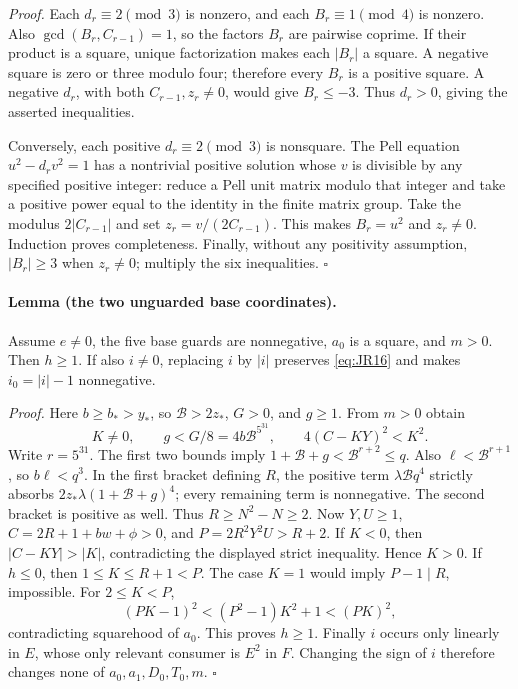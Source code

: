 \emph{Proof.}
Each \(d_r\equiv2\pmod3\) is nonzero, and each
\(B_r\equiv1\pmod4\) is nonzero.  Also
\(\gcd(B_r,C_{r-1})=1\), so the factors \(B_r\) are pairwise
coprime.  If their product is a square, unique factorization makes each
\(|B_r|\) a square.  A negative square is zero or three modulo four;
therefore every \(B_r\) is a positive square.
A negative \(d_r\), with both \(C_{r-1},z_r\ne0\), would give
\(B_r\le-3\).  Thus \(d_r>0\), giving the asserted inequalities.

Conversely, each positive \(d_r\equiv2\pmod3\) is nonsquare.
The Pell equation \(u^2-d_r v^2=1\) has a nontrivial positive solution
whose \(v\) is divisible by any specified positive integer: reduce a
Pell unit matrix modulo that integer and take a positive power equal
to the identity in the finite matrix group.  Take the modulus
\(2|C_{r-1}|\) and set \(z_r=v/(2C_{r-1})\).
This makes \(B_r=u^2\) and \(z_r\ne0\).  Induction proves
completeness.  Finally, without any positivity assumption,
\(|B_r|\ge3\) when \(z_r\ne0\); multiply the six inequalities.
\hfill\(\square\)

\paragraph{Lemma (the two unguarded base coordinates).}
Assume \(e\ne0\), the five base guards are nonnegative,
\(a_0\) is a square, and \(m>0\).  Then \(h\ge1\).
If also \(i\ne0\), replacing \(i\) by \(|i|\) preserves
\eqref{eq:JR16} and makes \(i_0=|i|-1\) nonnegative.

\emph{Proof.}
Here \(b\ge b_*>y_*\), so \(\mathcal B>2z_*\),
\(G>0\), and \(g\ge1\).  From \(m>0\) obtain
\[
 K\ne0,\qquad g<G/8=4b\mathcal B^{5^{31}},\qquad
 4(C-KY)^2<K^2.
\]
Write \(r=5^{31}\).  The first two bounds imply
\(1+\mathcal B+g<\mathcal B^{r+2}\le q\).
Also \(\ell<\mathcal B^{r+1}\), so \(b\ell<q^3\).
In the first bracket defining \(R\), the positive term
\(\lambda\mathcal Bq^4\) strictly absorbs
\(2z_*\lambda(1+\mathcal B+g)^4\); every remaining term is
nonnegative.  The second bracket is positive as well.  Thus
\(R\ge N^2-N\ge2\).
Now \(Y,U\ge1\), \(C=2R+1+bw+\phi>0\), and
\(P=2R^2Y^2U>R+2\).
If \(K<0\), then \(|C-KY|>|K|\), contradicting the displayed
strict inequality.  Hence \(K>0\).
If \(h\le0\), then \(1\le K\le R+1<P\).
The case \(K=1\) would imply \(P-1\mid R\), impossible.
For \(2\le K<P\),
\[
 (PK-1)^2<(P^2-1)K^2+1<(PK)^2,
\]
contradicting squarehood of \(a_0\).  This proves \(h\ge1\).
Finally \(i\) occurs only linearly in \(E\), whose only relevant
consumer is \(E^2\) in \(F\).  Changing the sign of \(i\)
therefore changes none of \(a_0,a_1,D_0,T_0,m\).
\hfill\(\square\)

